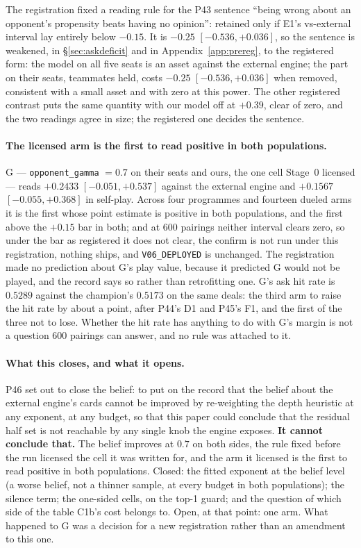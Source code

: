 \documentclass[11pt,letterpaper]{article}
\begin{document}
The registration fixed a reading rule for the P43 sentence ``being wrong about
an opponent's propensity beats having no opinion'': retained only if E1's
vs-external interval lay entirely below $-0.15$. It is $-0.25$
$[-0.536, +0.036]$, so the sentence is weakened, in \S\ref{sec:askdeficit}
and in Appendix~\ref{app:prereg}, to the registered form: the model on all
five seats is an asset against the external engine; the part on their seats, teammates
held, costs $-0.25$ $[-0.536, +0.036]$ when removed, consistent with a small
asset and with zero at this power. The other registered contrast puts the same
quantity with our model off at $+0.39$, clear of zero, and the two readings
agree in size; the registered one decides the sentence.

\paragraph{The licensed arm is the first to read positive in both
populations.} G --- \texttt{opponent\_gamma} $=0.7$ on their seats and ours,
the one cell Stage~0 licensed --- reads $+0.2433$ $[-0.051, +0.537]$ against
the external engine and $+0.1567$ $[-0.055, +0.368]$ in self-play. Across four programmes
and fourteen dueled arms it is the first whose point estimate is positive in
both populations, and the first above the $+0.15$ bar in both; and at $600$
pairings neither interval clears zero, so under the bar as registered it does
not clear, the confirm is not run under this registration, nothing ships, and
\texttt{V06\_DEPLOYED} is unchanged. The registration made no prediction
about G's play value, because it predicted G would not be played, and the
record says so rather than retrofitting one. G's ask hit rate is
$\mathbf{0.5289}$ against the champion's $\mathbf{0.5173}$ on the same deals:
the third arm to raise the hit rate by about a point, after P44's D1 and P45's
F1, and the first of the three not to lose. Whether the hit rate has anything
to do with G's margin is not a question $600$ pairings can answer, and no rule
was attached to it.

\paragraph{What this closes, and what it opens.} P46 set out to close the
belief: to put on the record that the belief about the external engine's cards cannot be
improved by re-weighting the depth heuristic at any exponent, at any budget,
so that this paper could conclude that the residual half set is not reachable
by any single knob the engine exposes. \textbf{It cannot conclude that.} The
belief improves at $0.7$ on both sides, the rule fixed before the run licensed
the cell it was written for, and the arm it licensed is the first to read
positive in both populations. Closed: the fitted exponent at the belief level
(a worse belief, not a thinner sample, at every budget in both populations);
the silence term; the one-sided cells, on the top-1 guard; and the question
of which side of the table C1b's cost belongs to. Open, at that point: one arm. What happened to G was a decision for a new
registration rather than an amendment to this one.
\end{document}
